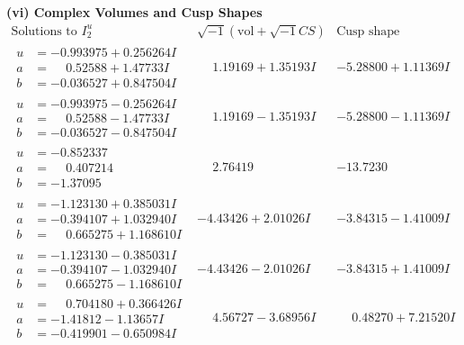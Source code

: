 \documentclass[1p]{elsarticle_modified}
\theoremstyle{definition}
\newcommand{\I}{\sqrt{-1}}
\begin{document}
\newpage\flushleft \textbf{(vi) Complex Volumes and Cusp Shapes}
$$\begin{array}{c|c|c}  
\text{Solutions to }I^u_{2}& \I (\text{vol} + \sqrt{-1}CS) & \text{Cusp shape}\\
 \hline 
\begin{aligned}
u &= -0.993975 + 0.256264 I \\
a &= \phantom{-}0.52588 + 1.47733 I \\
b &= -0.036527 + 0.847504 I\end{aligned}
 & \phantom{-}1.19169 + 1.35193 I & -5.28800 + 1.11369 I \\ \hline\begin{aligned}
u &= -0.993975 - 0.256264 I \\
a &= \phantom{-}0.52588 - 1.47733 I \\
b &= -0.036527 - 0.847504 I\end{aligned}
 & \phantom{-}1.19169 - 1.35193 I & -5.28800 - 1.11369 I \\ \hline\begin{aligned}
u &= -0.852337\phantom{ +0.000000I} \\
a &= \phantom{-}0.407214\phantom{ +0.000000I} \\
b &= -1.37095\phantom{ +0.000000I}\end{aligned}
 & \phantom{-}2.76419\phantom{ +0.000000I} & -13.7230\phantom{ +0.000000I} \\ \hline\begin{aligned}
u &= -1.123130 + 0.385031 I \\
a &= -0.394107 + 1.032940 I \\
b &= \phantom{-}0.665275 + 1.168610 I\end{aligned}
 & -4.43426 + 2.01026 I & -3.84315 - 1.41009 I \\ \hline\begin{aligned}
u &= -1.123130 - 0.385031 I \\
a &= -0.394107 - 1.032940 I \\
b &= \phantom{-}0.665275 - 1.168610 I\end{aligned}
 & -4.43426 - 2.01026 I & -3.84315 + 1.41009 I \\ \hline\begin{aligned}
u &= \phantom{-}0.704180 + 0.366426 I \\
a &= -1.41812 - 1.13657 I \\
b &= -0.419901 - 0.650984 I\end{aligned}
 & \phantom{-}4.56727 - 3.68956 I & \phantom{-}0.48270 + 7.21520 I \\ \hline\begin{aligned}

\end{aligned}
\end{array}$$
\end{document}
